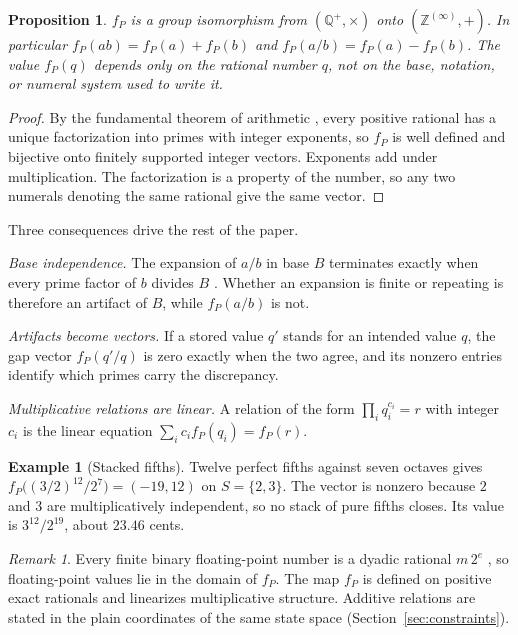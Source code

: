 \documentclass[11pt,letterpaper]{article}
\theoremstyle{plain}
\newtheorem{proposition}{Proposition}
\theoremstyle{definition}
\newtheorem{example}{Example}
\theoremstyle{remark}
\newtheorem{remark}{Remark}
\newcommand{\Q}{\mathbb{Q}}
\newcommand{\Z}{\mathbb{Z}}
\newcommand{\fP}{f_{P}}
\begin{document}
\begin{proposition}\label{prop:fp}
$\fP$ is a group isomorphism from $(\Q^{+},\times)$ onto $(\Z^{(\infty)},+)$. In particular $\fP(ab)=\fP(a)+\fP(b)$ and $\fP(a/b)=\fP(a)-\fP(b)$. The value $\fP(q)$ depends only on the rational number $q$, not on the base, notation, or numeral system used to write it.
\end{proposition}

\begin{proof}
By the fundamental theorem of arithmetic \cite{hardywright}, every positive rational has a unique factorization into primes with integer exponents, so $\fP$ is well defined and bijective onto finitely supported integer vectors. Exponents add under multiplication. The factorization is a property of the number, so any two numerals denoting the same rational give the same vector. \qedhere
\end{proof}

Three consequences drive the rest of the paper.

\emph{Base independence.} The expansion of $a/b$ in base $B$ terminates exactly when every prime factor of $b$ divides $B$ \cite{hardywright}. Whether an expansion is finite or repeating is therefore an artifact of $B$, while $\fP(a/b)$ is not.

\emph{Artifacts become vectors.} If a stored value $q'$ stands for an intended value $q$, the gap vector $\fP(q'/q)$ is zero exactly when the two agree, and its nonzero entries identify which primes carry the discrepancy.

\emph{Multiplicative relations are linear.} A relation of the form $\prod_i q_i^{c_i}=r$ with integer $c_i$ is the linear equation $\sum_i c_i\fP(q_i)=\fP(r)$.

\begin{example}[Stacked fifths]
Twelve perfect fifths against seven octaves gives $\fP\bigl((3/2)^{12}/2^{7}\bigr)=(-19,12)$ on $S=\{2,3\}$. The vector is nonzero because $2$ and $3$ are multiplicatively independent, so no stack of pure fifths closes. Its value is $3^{12}/2^{19}$, about $23.46$ cents.
\end{example}

\begin{remark}
Every finite binary floating-point number is a dyadic rational $m\,2^{e}$ \cite{ieee754}, so floating-point values lie in the domain of $\fP$. The map $\fP$ is defined on positive exact rationals and linearizes multiplicative structure. Additive relations are stated in the plain coordinates of the same state space (Section~\ref{sec:constraints}).
\end{remark}
\end{document}
